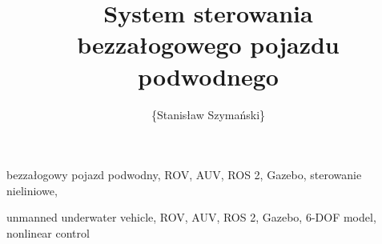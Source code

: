\documentclass[
    bindingoffset=5mm,  %
    footnoteindent=3mm, %
    hyphenation=true    %
]{src/wut-thesis}
\begin{document}
\title{
    System sterowania \\bezzałogowego pojazdu podwodnego
}
\author{\{Stanisław Szymański\}}
\date{\the\year}
\maketitle

\cleardoublepage %
\abstract 
\keywords bezzałogowy pojazd podwodny, ROV, AUV, ROS 2, Gazebo, sterowanie nieliniowe,

\clearpage
\secondabstract  %
\secondkeywords unmanned underwater vehicle, ROV, AUV, ROS 2, Gazebo, 6-DOF model, nonlinear control

\pagestyle{plain}

\cleardoublepage %
\tableofcontents

\cleardoublepage %
\pagestyle{headings}






\cleardoublepage %
\nocite{*} %
\printbibliography
\clearpage
\end{document}
